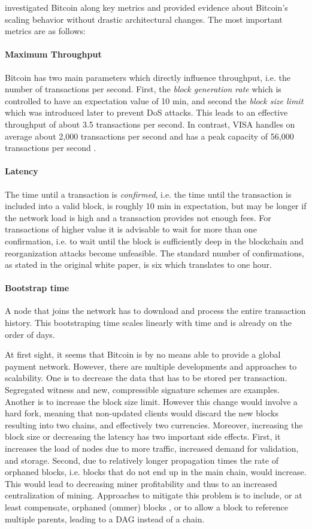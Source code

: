 \cite{croman2016scaling} investigated Bitcoin along key metrics and provided evidence about Bitcoin's scaling behavior without drastic architectural changes.
The most important metrics are as follows:
\paragraph{Maximum Throughput} 
Bitcoin has two main parameters which directly influence throughput, i.e. the number of transactions per second. First, the \emph{block generation rate} which is controlled to have an expectation value of 10 min, and second the \emph{block size limit} which was introduced later to prevent \ac{DoS} attacks. This leads to an effective throughput of about 3.5 transactions per second. In contrast, VISA handles on average about 2,000 transactions per second and has a peak capacity of 56,000 transactions per second \parencite{visa}. 
\paragraph{Latency} The time until a transaction is \emph{confirmed}, i.e. the time until the transaction is included into a valid block, is roughly 10 min in expectation, but may be longer if the network load is high and a transaction provides not enough fees. For transactions of higher value it is advisable to wait for more than one confirmation, i.e. to wait until the block is sufficiently deep in the blockchain and reorganization attacks become unfeasible. The standard number of confirmations, as stated in the original white paper, is six which translates to one hour. 
\paragraph{Bootstrap time} A node that joins the network has to download and process the entire transaction history. This bootstraping time scales linearly with time and is already on the order of days.

At first sight, it seems that Bitcoin is by no means able to provide a global payment network. However, there are multiple developments and approaches to scalability. One is to decrease the data that has to be stored per transaction. Segregated witness \parencite{bip141} and new, compressible signature schemes are examples. Another is to increase the block size limit. However this change would involve a hard fork, meaning that non-updated clients would discard the new blocks resulting into two chains, and effectively two currencies. Moreover, increasing the block size or decreasing the latency has two important side effects. First, it increases the load of nodes due to more traffic, increased demand for validation, and storage. Second, due to relatively longer propagation times the rate of orphaned blocks, i.e. blocks that do not end up in the main chain, would increase. This would lead to decreasing miner profitability and thus to an increased centralization of mining. Approaches to mitigate this problem is to include, or at least compensate, orphaned (ommer) blocks \parencite{kiayias2016trees,Lewenberg2015,Sompolinsky2015}, or to allow a block to reference multiple parents, leading to a \ac{DAG} instead of a chain.

